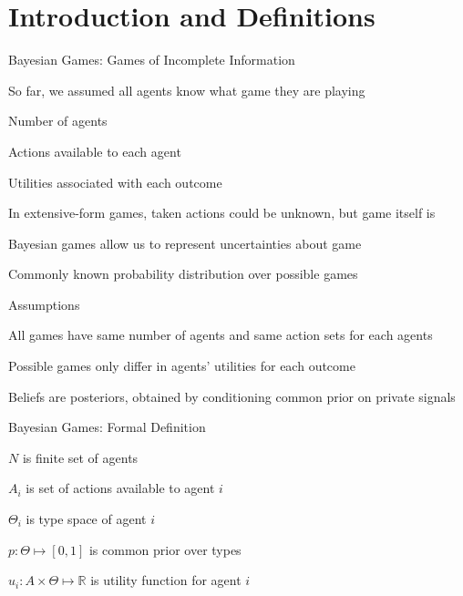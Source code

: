 \documentclass[11pt,aspectratio=169,handout]{beamer}
\subtitle{\vspace{2.1em}Lecture 8: Bayesian Games}
\begin{document}
 \begin{frame}[plain]
  \titlepage
 \end{frame} 
 
 \section{Introduction and Definitions}
 
  \begin{frame}{Bayesian Games: Games of Incomplete Information}
   \begin{itemizes}[1.2em]
    \item So far, we assumed \alert{all agents know} what game they are playing
    \begin{itemizes}[0.5em]
     \item Number of agents
     \item Actions available to each agent
     \item Utilities associated with each outcome
    \end{itemizes}
    \item In extensive-form games, \alert{taken actions} could be unknown, but \alert{game itself} is
    \item \alert{Bayesian games} allow us to represent uncertainties about game
    \begin{itemizes}[0.5em]
     \item \alert{Commonly known probability distribution} over possible games 
    \end{itemizes}
   \end{itemizes}
  \end{frame}
  
  
  \begin{frame}{Assumptions}
   \begin{itemizes}[1.5em]
    \item All games have \alert{same number of agents} and \alert{same action sets} for each agents
    \item Possible games only differ in agents' utilities for each outcome
    \item Beliefs are \alert{posteriors}, obtained by conditioning common prior on private signals
   \end{itemizes}
  \end{frame}


  \begin{frame}{Bayesian Games: Formal Definition}
   \begin{itemizes}[1.2em]
    \item $N$ is finite set of agents
    \item $A_i$ is set of actions available to agent $i$
    \item $\Theta_i$ is type space of agent $i$
    \item $p: \Theta \mapsto [0, 1]$ is common prior over types
    \item $u_i: A \times \Theta \mapsto \mathbb{R}$ is utility function for agent $i$
   \end{itemizes}
  \end{frame}
  
\end{document}
